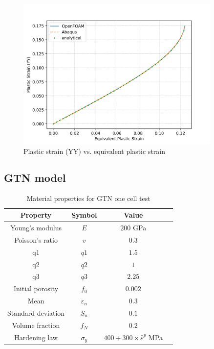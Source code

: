 \documentclass[sn-mathphys,Numbered,draft]{sn-jnl}%
\begin{document}
\begin{appendices}
\begin{figure}[htb]
\begin{center}
	\includegraphics[width=0.9\textwidth]{./figures/finiteVolumeImplementation/plasticStrainMult.png}
\caption{Plastic strain (YY) vs. equivalent plastic strain}
\label{fig:EqStrain_EqStress}
\end{center}
\end{figure}
\FloatBarrier


\subsection{GTN model}

\begin{table}[htb]
	\centering
		\begin{tabular}{cccc} \hline
			Property & Symbol & Value  \\ \hline 
			Young's modulus & $E$ & $200$ GPa \\
			Poisson's ratio & $v$ & $0.3$   \\
			q1 & $q1$ & $1.5$  \\
		    q2 & $q2$ & $1$  \\
		    q3 & $q3$ & $2.25$  \\
		    Initial porosity & $f_0$ & $0.002$  \\
		    Mean & $\varepsilon_n$ & $0.3$  \\
		    Standard deviation & $S_n$ & $0.1$  \\
		    Volume fraction & $f_N$ & $0.2$  \\
			Hardening law & $\sigma_y$ & $400+300\times{\bar{\varepsilon}}^p$ MPa  \\
			\hline
		\end{tabular}
	\caption{Material properties for GTN one cell test}
	\label{tab:material_properties}
\end{table}


\end{appendices}
\end{document}
